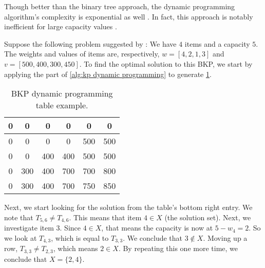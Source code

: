 Though better than the binary tree approach, the dynamic programming algorithm's complexity is exponential as well \cite{FEOFILOFF2020a}. In fact, this approach is notably inefficient for large capacity values \cite{HRISTAKEVA2005}.

\begin{example}
    Suppose the following problem suggested by \textcite{FEOFILOFF2020a}: We have $4$ items and a capacity $5$. The weights and values of items are, respectively, $w = [4, 2, 1, 3]$ and $v = [500, 400, 300, 450]$. To find the optimal solution to this BKP, we start by applying the part of \cref{alg:kp dynamic programming} to generate \cref{tab:kp dynamic programming table}.

    \begin{table}[h]
        \centering
        \begin{tabular}{|c c c c c c|}
            \hline
            0 & 0 & 0 & 0 & 0 & 0\\
            \hline
            0 & 0 & 0 & 0 & 500 & 500\\
            \hline
            0 & 0 & 400 & 400 & 500 & 500\\
            \hline
            0 & 300 & 400 & 700 & 700 & 800\\
            \hline
            0 & 300 & 400 & 700 & 750 & 850\\
            \hline
        \end{tabular}
        \caption{BKP dynamic programming table example.}
        \label{tab:kp dynamic programming table}
    \end{table}

    Next, we start looking for the solution from the table's bottom right entry. We note that $T_{5,6} \neq T_{4,6}$. This means that item $4 \in X$ (the solution set). Next, we investigate item $3$. Since $4 \in X$, that means the capacity is now at $5 - w_4 = 2$. So we look at $T_{4,3}$, which is equal to $T_{3,3}$. We conclude that $3 \notin X$. Moving up a row, $T_{3,3} \neq T_{2,3}$, which means $2 \in X$. By repeating this one more time, we conclude that $X = \{2,4\}$.
\end{example}